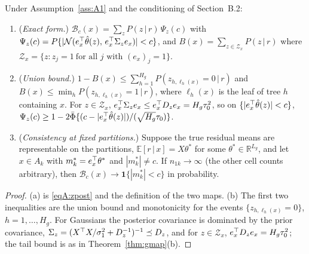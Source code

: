 \documentclass[11pt]{article}
\newcommand{\E}{\mathbb{E}}
\newcommand{\Normal}{\mathcal{N}}
\newcommand{\given}{\,\vert\,}
\theoremstyle{definition}
\theoremstyle{plain}
\begin{document}
{\begin{propA}\label{prop:ensemble}
Under Assumption~\ref{ass:A1} and the conditioning of Section~B.2:
\begin{enumerate}[label=(\alph*),leftmargin=2.2em]
\item (\emph{Exact form.}) $\mathcal B_c(x)=\sum_zP(z\given r)\,\Psi_z(c)$ with $\Psi_z(c)=P\{|\Normal(e_x\tr\hat\theta(z),\,e_x\tr\Sigma_ze_x)|<c\}$, and $B(x)=\sum_{z\in\mathcal Z_x}P(z\given r)$ where $\mathcal Z_x=\{z:z_j=1\ \text{for all }j\text{ with }(e_x)_j=1\}$.
\item (\emph{Union bound.}) $1-B(x)\le\sum_{h=1}^{H_g}P(z_{h,\ell_h(x)}=0\given r)$ and $B(x)\le\min_hP(z_{h,\ell_h(x)}=1\given r)$, where $\ell_h(x)$ is the leaf of tree $h$ containing $x$. For $z\in\mathcal Z_x$, $e_x^{\top}\Sigma_ze_x\le e_x^{\top} D_ze_x=H_g\tau_0^2$, so on $\{|e_x^{\top}\hat\theta(z)|<c\}$, $\Psi_z(c)\ge1-2\bar\Phi\{(c-|e_x^{\top}\hat\theta(z)|)/(\sqrt{H_g}\tau_0)\}$.
\item (\emph{Consistency at fixed partitions.}) Suppose the true residual means are representable on the partitions, $\E[r\given x]=X\theta^\ast$ for some $\theta^\ast\in\mathbb R^{L_g}$, and let $x\in A_k$ with $m_k^\ast=e_x^{\top}\theta^\ast$ and $|m_k^\ast|\ne c$. If $n_{1k}\to\infty$ (the other cell counts arbitrary), then $\mathcal B_c(x)\to\mathbf 1\{|m^\ast_k|<c\}$ in probability.
\end{enumerate}
\end{propA}

\begin{proof}
(a) is \eqref{eqA:zpost} and the definition of the two maps. (b) The first two inequalities are the union bound and monotonicity for the events $\{z_{h,\ell_h(x)}=0\}$, $h=1,\dots,H_g$. For Gaussians the posterior covariance is dominated by the prior covariance, $\Sigma_z=(X^{\top} X/\sigma_1^2+D_z^{-1})^{-1}\preceq D_z$, and for $z\in\mathcal Z_x$, $e_x^{\top} D_ze_x=H_g\tau_0^2$; the tail bound is as in Theorem~\ref{thm:gmap}(b).


\end{proof}}
\end{document}
